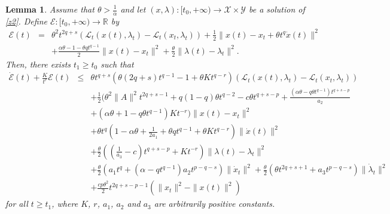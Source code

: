 \documentclass[review]{elsarticle}
\newtheorem{lemma}{Lemma}[section]
\begin{document}
	\begin{lemma}\label{lemma3.1}
		Assume that $\theta>\frac{1}{\alpha}$ and let $(x,\lambda): [t_{0},+\infty)\rightarrow \mathcal{X}\times\mathcal{Y}$ be a solution of \eqref{z2}. Define $\mathcal{E}:[t_0,+\infty)\to \mathbb{R}$ by
		\begin{eqnarray}\label{z8}
			\mathcal{E}(t)&=&\theta^2 t^{2q+s}\left(\mathcal{L}_{t}(x(t),\lambda_t)-\mathcal{L}_{t}(x_t,\lambda_t)\right)+\frac{1}{2}\|x(t)-x_t+\theta t^q\dot{x}(t)\|^2\nonumber\\
			&&+\frac{\alpha\theta-1-\theta q t^{q-1}}{2}\|x(t)-x_t\|^2+\frac{\theta}{2}\|\lambda(t)-\lambda_t\|^2.
		\end{eqnarray}
		Then, there exists $t_1\ge t_0$ such that
		\begin{eqnarray*}
			\dot{\mathcal{E}}(t)+\frac{K}{t^r}\mathcal{E}(t)&\leq&\theta t^{q+s}\left(\theta(2q+s)t^{q-1}-1+\theta Kt^{q-r}\right) \left(\mathcal{L}_{t}(x(t),\lambda_t)-\mathcal{L}_{t}(x_t,\lambda_t)\right)\\
			&&+\frac{1}{2}(\theta^2\|A\|^2t^{2q+s-1}+q(1-q)\theta t^{q-2}-c\theta t^{q+s-p}+\frac{(\alpha\theta-q\theta t^{q-1})t^{q+s-p}}{a_2}\\
			&&+(\alpha\theta+1-q\theta t^{q-1})Kt^{-r})\|x(t)-x_t\|^2\\
			&&+\theta t^q\left(1-\alpha\theta+\frac{1}{2a_1}+\theta qt^{q-1}+\theta Kt^{q-r}\right)\|\dot{x}(t)\|^2\\
			&&+\frac{\theta}{2}\left(\left(\frac{1}{a_3}-c\right)t^{q+s-p}+Kt^{-r}\right)\|\lambda(t)-\lambda_t\|^2\\
			&&+\frac{\theta}{2}\left(a_1 t^q+(\alpha-qt^{q-1})a_2t^{p-q-s}\right)\|\dot{x}_t\|^2+\frac{\theta}{2}\left(\theta t^{2q+s+1}+a_3t^{p-q-s}\right)\|\dot{\lambda}_t\|^2\\
			&&+\frac{cp\theta^2}{2}t^{2q+s-p-1}\left(\|x_t\|^2-\|x(t)\|^2\right) 
		\end{eqnarray*}
for all  $t\ge t_1$, where $K$, $r$, $a_1$, $a_2$ and $a_3$ are arbitrarily positive constants.
	\end{lemma}
	
\end{document}
